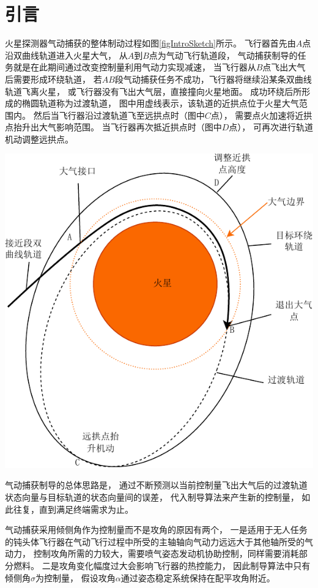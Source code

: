 \section{引\quad 言}
火星探测器气动捕获的整体制动过程如图\ref{figIntroSketch}所示。
飞行器首先由$A$点沿双曲线轨道进入火星大气，
从$A$到$B$点为气动飞行轨道段，
气动捕获制导的任务就是在此期间通过改变控制量利用气动力实现减速，
当飞行器从$B$点飞出大气后需要形成环绕轨道，
若$AB$段气动捕获任务不成功，飞行器将继续沿某条双曲线轨道飞离火星，
或飞行器没有飞出大气层，直接撞向火星地面。
成功环绕后所形成的椭圆轨道称为过渡轨道，
图中用虚线表示，该轨道的近拱点位于火星大气范围内。
然后当飞行器沿过渡轨道飞至远拱点时（图中$C$点），
需要点火加速将近拱点抬升出大气影响范围。
当飞行器再次抵近拱点时（图中$D$点），
可再次进行轨道机动调整远拱点。\cite{dqingyuan2019}
\begin{center}
	\includegraphics[scale=0.8]{IntroSketch.pdf}  \\
	 \label{figIntroSketch}
\end{center}

气动捕获制导的总体思路是，
通过不断预测以当前控制量飞出大气后的过渡轨道状态向量与目标轨道的状态向量间的误差，
代入制导算法来产生新的控制量，
如此往复，直到满足终端需求为止\cite{dqingyuan2019}。

气动捕获采用倾侧角作为控制量而不是攻角的原因有两个，
一是适用于无人任务的钝头体飞行器在气动飞行过程中所受的主轴轴向气动力远远大于其他轴所受的气动力，
控制攻角所需的力较大，需要喷气姿态发动机协助控制，同样需要消耗部分燃料。
二是攻角变化幅度过大会影响飞行器的热控能力，
因此制导算法中只有倾侧角$\sigma$为控制量，
假设攻角$\alpha$通过姿态稳定系统保持在配平攻角附近。
